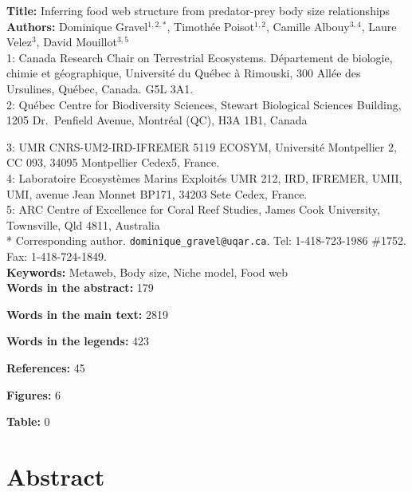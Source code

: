\documentclass[12pt]{article}
\begin{document}
\linenumbers 
\modulolinenumbers[1]

\textbf{Title:}   Inferring food web structure from predator-prey body size relationships\\

\textbf{Authors:}  Dominique Gravel$^{1,2,*}$, Timoth\'ee Poisot$^{1,2}$, Camille Albouy$^{3,4}$, Laure Velez$^{3}$, David Mouillot$^{3,5}$\\

1: Canada Research Chair on Terrestrial Ecosystems. D\'epartement de biologie, chimie et g\'eographique, Universit\'e du Qu\'ebec \`a Rimouski, 300 All\'ee des Ursulines, Qu\'ebec, Canada. G5L 3A1.\\

2: Qu\'ebec Centre for Biodiversity Sciences, Stewart Biological Sciences Building, 1205 Dr.~Penfield Avenue, Montr\'eal (QC), H3A 1B1, Canada

3: UMR CNRS-UM2-IRD-IFREMER 5119 ECOSYM, Universit\'e Montpellier 2, CC 093, 34095 Montpellier Cedex5, France.\\

4: Laboratoire Ecosystèmes Marins Exploit\'es UMR 212, IRD, IFREMER, UMII, UMI, avenue Jean Monnet BP171, 34203 Sete Cedex, France.\\

5: ARC Centre of Excellence for Coral Reef Studies, James Cook University, Townsville, Qld 4811, Australia\\

* Corresponding author. {\tt dominique\_gravel@uqar.ca}. Tel: 1-418-723-1986 \#1752. Fax: 1-418-724-1849.\\

\textbf{Keywords:} Metaweb, Body size, Niche model, Food web\\

\textbf{Words in the abstract:}      179

\textbf{Words in the main text:}     2819

\textbf{Words in the legends:}       423

\textbf{References:}                   45

\textbf{Figures:}                       6

\textbf{Table:}                         0

\newpage
\doublespacing

\section*{Abstract}
\end{document}
